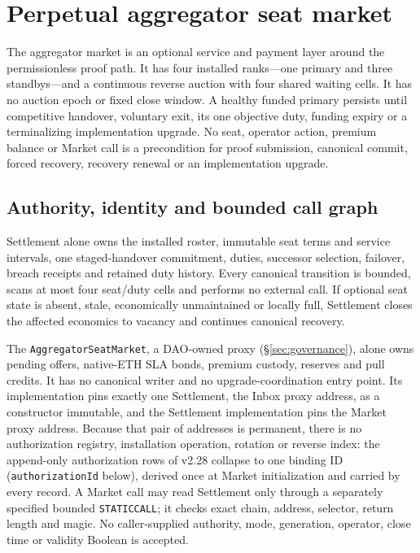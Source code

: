 \documentclass[a4paper,11pt]{article}
\newcommand{\code}[1]{\nolinkurl{#1}}
\begin{document}
\section{Perpetual aggregator seat market}\label{sec:seat-market}

The aggregator market is an optional service and payment layer around the
permissionless proof path.  It has four installed ranks---one primary and three
standbys---and a continuous reverse auction with four shared waiting cells.  It
has no auction epoch or fixed close window.  A healthy funded primary persists
until competitive handover, voluntary exit, its one objective duty, funding
expiry or a terminalizing implementation upgrade.  No seat, operator action,
premium balance or Market call is a precondition for proof submission,
canonical commit, forced recovery, recovery renewal or an implementation
upgrade.

\subsection{Authority, identity and bounded call graph}

Settlement alone owns the installed roster, immutable seat terms and service
intervals, one staged-handover commitment, duties, successor selection,
failover, breach receipts and retained duty history.  Every
canonical transition is bounded, scans at most four seat/duty cells and performs
no external call.  If optional seat state is absent, stale, economically
unmaintained or locally full, Settlement closes the affected economics to
vacancy and continues canonical recovery.

The \code{AggregatorSeatMarket}, a DAO-owned proxy (\S\ref{sec:governance}),
alone owns pending offers, native-ETH SLA bonds, premium custody, reserves and
pull credits.  It has no canonical writer and no upgrade-coordination entry
point.  Its implementation pins exactly one Settlement, the Inbox proxy
address, as a constructor immutable, and the Settlement implementation pins the
Market proxy address.  Because that pair of addresses is permanent, there is no
authorization registry, installation operation, rotation or reverse index: the
append-only authorization rows of v2.28 collapse to one binding ID
(\code{authorizationId} below), derived once at Market initialization and
carried by every record.  A Market call may read Settlement only through a
separately specified bounded \code{STATICCALL}; it checks exact chain,
address, selector, return length and magic.  No caller-supplied authority,
mode, generation, operator, close time or validity Boolean is accepted.
\end{document}
